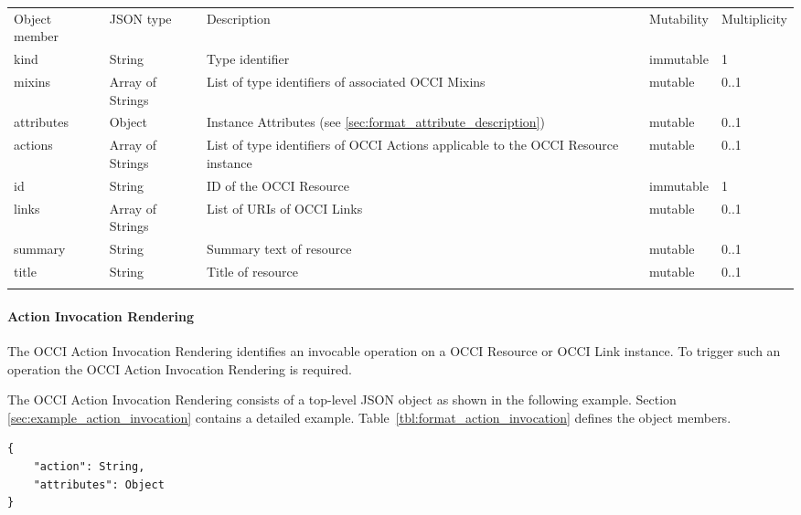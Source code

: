 \documentclass[10pt,a4paper]{article}
\begin{document}
 {
    \begin{tabularx}{\textwidth}{llXll}
    \toprule
    Object member & JSON type & Description & Mutability & Multiplicity \\
    \colrule
    kind & String & Type identifier & immutable & 1 \\

    mixins & Array of Strings & List of type identifiers of associated OCCI
Mixins  &
mutable & 0..1 \\

    attributes & Object & Instance Attributes (see
\ref{sec:format_attribute_description}) & mutable & 0..1 \\

    actions & Array of Strings & List of type identifiers of OCCI
Actions applicable to the OCCI Resource instance & mutable & 0..1 \\

    id & String & ID of the OCCI Resource & immutable & 1\\

    links & Array of Strings & List of URIs of OCCI Links & mutable & 0..1\\
    summary & String & Summary text of resource & mutable & 0..1 \\
    title & String & Title of resource & mutable & 0..1 \\
    \botrule
    \end{tabularx}
}

\paragraph{Action Invocation Rendering}
\label{sec:format_action_invocation}

The OCCI Action Invocation Rendering identifies an invocable operation on a OCCI Resource or
OCCI Link instance. To trigger such an operation the OCCI Action Invocation
Rendering is required.

The OCCI Action Invocation Rendering consists of a top-level JSON object as shown in the
following example. Section \ref{sec:example_action_invocation} contains a detailed example.
Table~\ref{tbl:format_action_invocation} defines the object members.

\begin{lstlisting}
{
    "action": String,
    "attributes": Object
}
\end{lstlisting}
\end{document}
